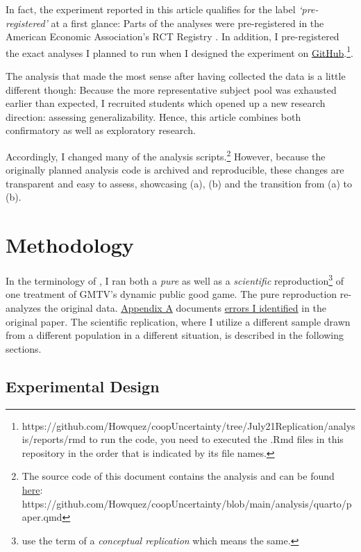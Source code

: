 \documentclass[
  authoryear,
  preprint,
  3p]{elsarticle}
\begin{document}
In fact, the experiment reported in this article qualifies for the label
\emph{`pre-registered'} at a first glance: Parts of the analyses were
pre-registered in the American Economic Association's RCT Registry
\citep{preregistration}. In addition, I pre-registered the exact
analyses I planned to run when I designed the experiment on
\href{https://github.com/Howquez/coopUncertainty/blob/July21Replication/analysis/reports/rmd}{GitHub}.\footnote{https://github.com/Howquez/coopUncertainty/tree/July21Replication/analysis/reports/rmd
  to run the code, you need to executed the .Rmd files in this
  repository in the order that is indicated by its file names.}.

The analysis that made the most sense after having collected the data is
a little different though: Because the more representative subject pool
was exhausted earlier than expected, I recruited students which opened
up a new research direction: assessing generalizability. Hence, this
article combines both confirmatory as well as exploratory research.

Accordingly, I changed many of the analysis scripts.\footnote{The source
  code of this document contains the analysis and can be found
  \href{https://github.com/Howquez/coopUncertainty/blob/main/analysis/quarto/paper.qmd}{here}:
  https://github.com/Howquez/coopUncertainty/blob/main/analysis/quarto/paper.qmd}
However, because the originally planned analysis code is archived and
reproducible, these changes are transparent and easy to assess,
showcasing (a), (b) and the transition from (a) to (b).

\hypertarget{sec-methods}{%
\section{Methodology}\label{sec-methods}}

In the terminology of \citet{Hamermesh2007}, I ran both a \emph{pure} as
well as a \emph{scientific} reproduction\footnote{\citet{Parsons2022}
  use the term of a \emph{conceptual replication} which means the same.}
of one treatment of GMTV's dynamic public good game. The pure
reproduction re-analyzes the original data.
\protect\hyperlink{A:-Pure-Replication}{Appendix A} documents
\href{}{errors I identified} in the original paper. The scientific
replication, where I utilize a different sample drawn from a different
population in a different situation, is described in the following
sections.

\hypertarget{sec-design}{%
\subsection{Experimental Design}\label{sec-design}}
\end{document}
